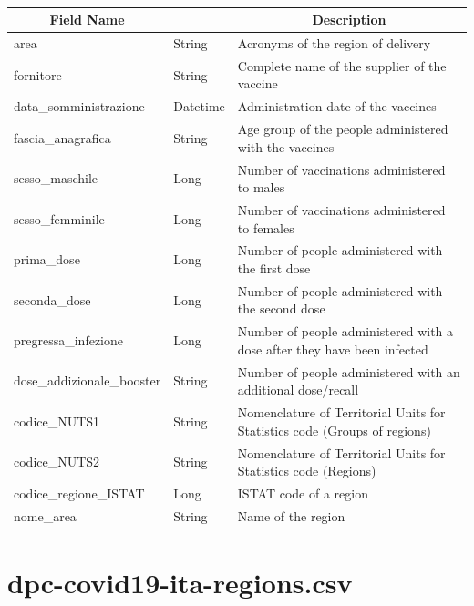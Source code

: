 \documentclass[a4paper,12pt]{article}
\begin{document}
\paragraph{}
\begin{center}
\begin{tabular}{|m{45mm}|>{\raggedright}m{16mm}|m{75mm}|}
\hline
\multicolumn{1}{|c|}{\textbf{ Field Name }}
& \multicolumn{1}{c|}{\textbf{ Data Type }} 
    	& \multicolumn{1}{c|}{\textbf{ Description }}\\
\hline
area & String & Acronyms of the region of delivery \\
\hline
fornitore & String & Complete name of the supplier of the vaccine \\
\hline
data\_somministrazione & Datetime & Administration date of the vaccines \\
\hline
fascia\_anagrafica & String & Age group of the people administered with the vaccines \\
\hline
sesso\_maschile & Long & Number of vaccinations administered to males \\
\hline
sesso\_femminile & Long & Number of vaccinations administered to females \\
\hline
prima\_dose & Long & Number of people administered with the first dose \\
\hline
seconda\_dose & Long & Number of people administered with the second dose \\
\hline
pregressa\_infezione & Long & Number of people administered with a dose after they have
been infected \\
\hline
dose\_addizionale\_booster & String & Number of people administered with an additional dose/recall \\
\hline
codice\_NUTS1 & String & Nomenclature of Territorial Units for Statistics code (Groups of regions) \\
\hline
codice\_NUTS2 & String & Nomenclature of Territorial Units for Statistics code (Regions) \\
\hline
codice\_regione\_ISTAT & Long & ISTAT code of a region \\
\hline
nome\_area & String & Name of the region \\
\hline
\end{tabular}
\end{center}
\newpage

\section{dpc-covid19-ita-regions.csv}
\end{document}
